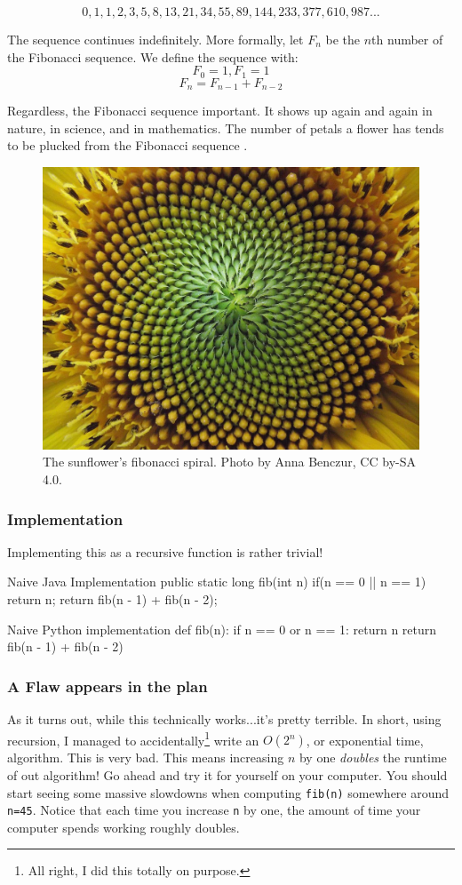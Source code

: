$$0, 1, 1, 2, 3, 5, 8, 13, 21, 34, 55, 89, 144, 233, 377, 610, 987...$$

The sequence continues indefinitely. More formally, let $F_n$ be the $n$th number of the Fibonacci sequence. We define the sequence with:
$$ F_{0} = 1, F_{1} = 1$$
$$ F_n = F_{n-1} + F_{n-2}$$


Regardless, the Fibonacci sequence important.  It shows up again and again in nature, in science, and in mathematics.  The number of petals a flower has tends to be plucked from the Fibonacci sequence \cite{turner2020flowers}.

\begin{figure}
	\centering
	\includegraphics[width=0.7\linewidth]{pics/sunflower}
	\caption{The sunflower's fibonacci spiral. Photo by Anna Benczur, CC by-SA 4.0.}
	\label{fig:sunflower}
\end{figure}



\subsubsection{Implementation}
Implementing this as a recursive function is rather trivial!

\begin{javacode}{Naive Java Implementation}
public static long fib(int n){
	if(n == 0 || n == 1) {
		return n;
	}
	return fib(n - 1) + fib(n - 2);
}
\end{javacode}

\begin{pycode}{Naive Python implementation}
def fib(n):
	if n == 0 or n == 1:
		return n
	return fib(n - 1) + fib(n - 2)
\end{pycode}

\subsubsection{A Flaw appears in the plan}
As it turns out, while this technically works...it's pretty terrible.  In short, using recursion, I managed to accidentally\footnote{All right, I did this totally on purpose.} write an $ O(2^n) $, or exponential time, algorithm. This is very bad.  This means increasing $ n $ by one \emph{doubles} the runtime of out algorithm! Go ahead and try it for yourself on your computer.  You should start seeing some massive slowdowns when computing \texttt{fib(n)} somewhere around \texttt{n=45}.  Notice that each time you increase \texttt{n} by one, the amount of time your computer spends working roughly doubles.

